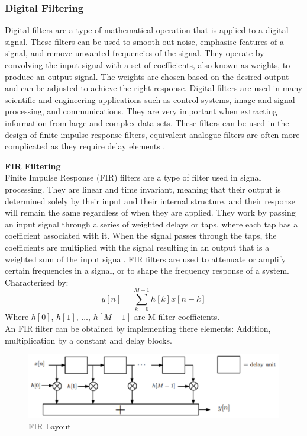\documentclass[12pt,a4paper]{article}
\begin{document}
			\subsubsection{Digital Filtering}
			Digital filters are a type of mathematical operation that is applied to a digital signal. These filters can be used to smooth out noise, emphasise features of a signal, and remove unwanted frequencies of the signal. They operate by convolving the input signal with a set of coefficients, also known as weights, to produce an output signal. The weights are chosen based on the desired output and can be adjusted to achieve the right response.
Digital filters are used in many scientific and engineering applications such as control systems, image and signal processing, and communications. They are very important when extracting information from large and complex data sets. These filters can be used in the design of finite impulse response filters, equivalent analogue filters are often more complicated as they require delay elements \cite{Digital_Filtering}.

			\textbf{FIR Filtering}\\
			Finite Impulse Response (FIR) filters are a type of filter used in signal processing. They are linear and time invariant, meaning that their output is determined solely by their input and their internal structure, and their response will remain the same regardless of when they are applied. They work by passing an input signal through a series of weighted delays or taps, where each tap has a coefficient associated with it. When the signal passes through the taps, the coefficients are multiplied with the signal resulting in an output that is a weighted sum of the input signal. FIR filters are used to attenuate or amplify certain frequencies in a signal, or to shape the frequency response of a system.\\
			Characterised by:
			$$
				y[n] = \sum_{k = 0}^{M - 1}h[k]x[n - k]
			$$
			Where $h[0]$, $h[1]$, $\ldots$, $h[M-1]$ are M filter coefficients.\\
			An FIR filter can be obtained by implementing there elements: Addition, multiplication by a constant and delay blocks\cite{FIR}.
			\begin{figure}[H]
				\begin{center}
					\includegraphics[width=0.7\linewidth]{FIR}
				\end{center}
				\caption{FIR Layout}
			\end{figure}
\end{document}

